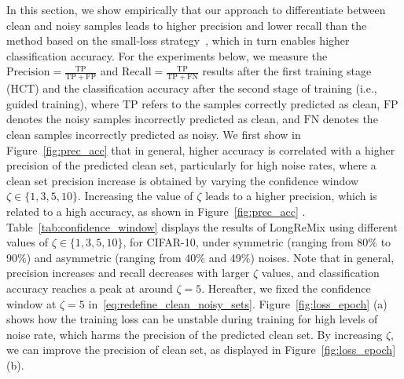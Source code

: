 \documentclass[review]{elsarticle}
\begin{document}
In this section, we show empirically that our approach to differentiate between clean and noisy samples leads to higher precision and lower recall than the method based on the small-loss strategy~\cite{li2020dividemix}, which in turn enables higher classification accuracy.
For the experiments below, we measure the $\text{Precision} = \frac{\mathrm{TP}}{\mathrm{TP}+\mathrm{FP}}$ and $\text{Recall} = \frac{\mathrm{TP}}{\mathrm{TP}+\mathrm{FN}}$ results after the first training stage (HCT) and the classification accuracy after the second stage of training (i.e., guided training), where $\mathrm{TP}$ refers to the samples correctly predicted as clean,  $\mathrm{FP}$ denotes the noisy samples incorrectly predicted as clean, and $\mathrm{FN}$ denotes the clean samples incorrectly predicted as noisy.
We first show in Figure~\ref{fig:prec_acc} that in general, higher accuracy is correlated with a higher precision of the predicted clean set, particularly for high noise rates, where a clean set precision increase is obtained by varying the confidence window $\zeta \in \{1,3,5,10\}$. Increasing the value of $\zeta$ leads to a higher precision, which is related to a high accuracy, as shown in Figure~\ref{fig:prec_acc} . Table~\ref{tab:confidence_window} displays the results of LongReMix using different values of $\zeta \in \{1,3,5,10\}$, for CIFAR-10, under symmetric (ranging from 80\% to 90\%) and asymmetric (ranging from 40\% and 49\%) noises. Note that in general, precision increases and recall decreases with larger $\zeta$ values, and classification accuracy reaches a peak at around $\zeta=5$. Hereafter, we fixed the confidence window at $\zeta=5$ in~\eqref{eq:redefine_clean_noisy_sets}. Figure~\ref{fig:loss_epoch} (a) shows how the training loss can be unstable during training for high levels of noise rate, which harms the precision of the predicted clean set. By increasing $\zeta$, we can improve the precision of clean set, as displayed in Figure~\ref{fig:loss_epoch} (b).
\end{document}
